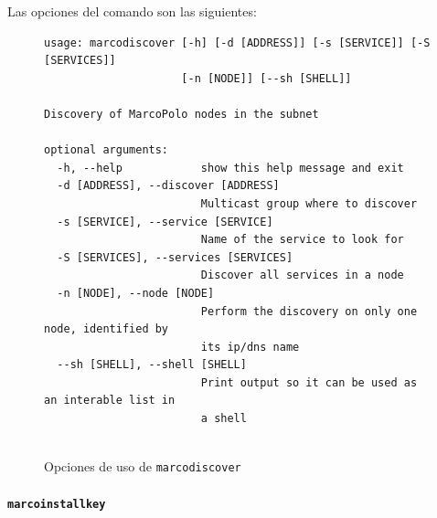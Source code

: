 Las opciones del comando son las siguientes:

\begin{figure}[H]
\centering



\begin{lstlisting}
usage: marcodiscover [-h] [-d [ADDRESS]] [-s [SERVICE]] [-S [SERVICES]]
                     [-n [NODE]] [--sh [SHELL]]

Discovery of MarcoPolo nodes in the subnet

optional arguments:
  -h, --help            show this help message and exit
  -d [ADDRESS], --discover [ADDRESS]
                        Multicast group where to discover
  -s [SERVICE], --service [SERVICE]
                        Name of the service to look for
  -S [SERVICES], --services [SERVICES]
                        Discover all services in a node
  -n [NODE], --node [NODE]
                        Perform the discovery on only one node, identified by
                        its ip/dns name
  --sh [SHELL], --shell [SHELL]
                        Print output so it can be used as an interable list in
                        a shell


\end{lstlisting}
\caption{Opciones de uso de \texttt{marcodiscover}}
\label{fig:marcodiscover_help}
\end{figure}

\paragraph{\texttt{marcoinstallkey}\\}
\label{marcoinstallkey}

